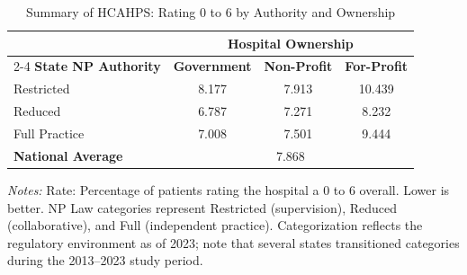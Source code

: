 \begin{table}[htbp]
    \centering
    \caption{Summary of HCAHPS: Rating 0 to 6 by Authority and Ownership}
    \label{tab:h_hosp_rating_0_6}
    \vspace{0.2cm}
    \begin{tabular}{lccc}
        \toprule
        & \multicolumn{3}{c}{\textbf{Hospital Ownership}} \\
        \cmidrule(lr){2-4}
        \textbf{State NP Authority} & \textbf{Government} & \textbf{Non-Profit} & \textbf{For-Profit} \\
        \midrule
        Restricted & 8.177 & 7.913 & 10.439 \\
        Reduced & 6.787 & 7.271 & 8.232 \\
        Full Practice & 7.008 & 7.501 & 9.444 \\
        \midrule
        \textbf{National Average} & \multicolumn{3}{c}{7.868} \\
        \bottomrule
    \end{tabular}
    \vspace{0.1cm}
    \begin{minipage}{0.85\textwidth}
        \footnotesize \textit{Notes:} Rate: Percentage of patients rating the hospital a 0 to 6 overall. Lower is better. NP Law categories represent Restricted (supervision), Reduced (collaborative), and Full (independent practice). Categorization reflects the regulatory environment as of 2023; note that several states transitioned categories during the 2013--2023 study period.
    \end{minipage}
\end{table}